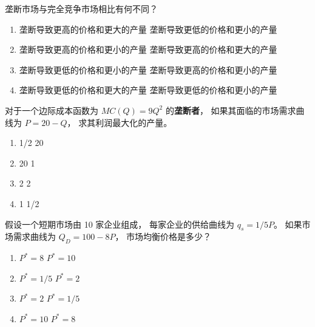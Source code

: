 \begin{question}[type=exam]{3}
  垄断市场与完全竞争市场相比有何不同？
  \begin{enumerate}[label=\alph*), noitemsep]
    \item \vary
      {垄断导致更高的价格和更大的产量}
      {垄断导致更低的价格和更小的产量}
    \item \vary
      {垄断导致更高的价格和更小的产量} %
      {垄断导致更高的价格和更大的产量}
    \item \vary
      {垄断导致更低的价格和更小的产量}
      {垄断导致更高的价格和更小的产量} %
    \item \vary
      {垄断导致更低的价格和更大的产量}
      {垄断导致更低的价格和更小的产量}
  \end{enumerate}
\end{question}


\newpage

\begin{question}[type=exam]{3}
  对于一个边际成本函数为 $MC(Q)=9Q^2$ 的\textbf{垄断者}，
  如果其面临的市场需求曲线为 $P=20-Q$，
  求其利润最大化的产量。
  \begin{enumerate}[label=\alph*), noitemsep]
    \item \vary
      {1/2}
      {20}
    \item \vary
      {20}
      {1} %
    \item \vary
      {2} 
      {2} 
    \item \vary
      {1} %
      {1/2}
  \end{enumerate}
\end{question}

\begin{question}[type=exam]{3}
  假设一个短期市场由 10 家企业组成，
  每家企业的供给曲线为 $q_s=1/5P$。
  如果市场需求曲线为 $Q_D=100-8P$，
  市场均衡价格是多少？
  \begin{enumerate}[label=\alph*), noitemsep]
    \item \vary
      {$P^*=8$}
      {$P^*=10$} %
    \item \vary
      {$P^*=1/5$}
      {$P^*=2$}
    \item \vary
      {$P^*=2$}
      {$P^*=1/5$}
    \item \vary
      {$P^*=10$} %
      {$P^*=8$}
  \end{enumerate}
\end{question}

